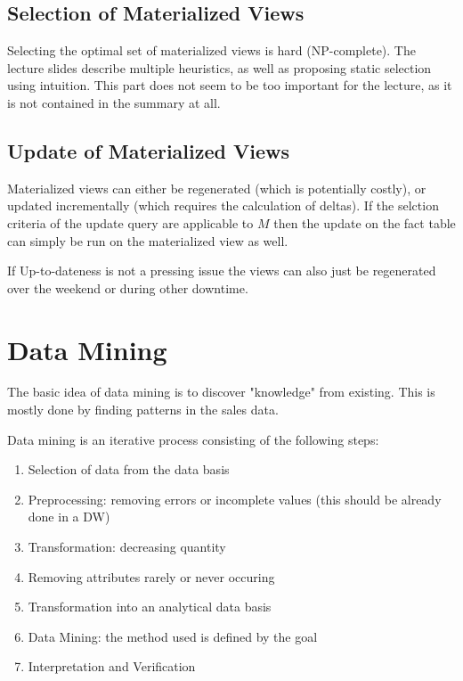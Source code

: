 \documentclass{article}
\begin{document}
\subsection{Selection of Materialized Views}
Selecting the optimal set of materialized views is hard (NP-complete).
The lecture slides describe multiple heuristics, as well as proposing static selection using intuition.
This part does not seem to be too important for the lecture, as it is not contained in the summary at all.

\subsection{Update of Materialized Views}
Materialized views can either be regenerated (which is potentially costly), or updated incrementally (which requires the calculation of deltas).
If the selction criteria of the update query are applicable to $M$ then the update on the fact table can simply be run on the materialized view as well.

If Up-to-dateness is not a pressing issue the views can also just be regenerated over the weekend or during other downtime.

\section{Data Mining}
The basic idea of data mining is to discover "knowledge" from existing.
This is mostly done by finding patterns in the sales data.

Data mining is an iterative process consisting of the following steps:
\begin{enumerate}
    \item Selection of data from the data basis
    \item Preprocessing: removing errors or incomplete values (this should be already done in a DW)
    \item Transformation: decreasing quantity
    \item Removing attributes rarely or never occuring
    \item Transformation into an analytical data basis
    \item Data Mining: the method used is defined by the goal
    \item Interpretation and Verification
\end{enumerate}
\end{document}
